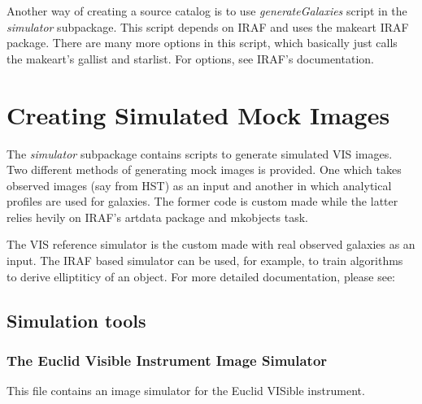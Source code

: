 \documentclass[a4paper,11pt,english]{sphinxmanual}
\begin{document}
Another way of creating a source catalog is to use \emph{generateGalaxies} script in the \emph{simulator} subpackage.
This script depends on IRAF and uses the makeart IRAF package. There are many more options in this script,
which basically just calls the makeart's gallist and starlist. For options, see IRAF's documentation.


\chapter{Creating Simulated Mock Images}
\label{index:creating-simulated-mock-images}
The \emph{simulator} subpackage contains scripts to generate simulated VIS images. Two different methods
of generating mock images is provided. One which takes observed images (say from HST) as an input and
another in which analytical profiles are used for galaxies. The former code is custom made while the
latter relies hevily on IRAF's artdata package and mkobjects task.

The VIS reference simulator is the custom made with real observed galaxies as an input. The IRAF
based simulator can be used, for example, to train algorithms to derive elliptiticy of an object.
For more detailed documentation, please see:


\section{Simulation tools}
\label{simulator:module-simulator.simulator}\label{simulator::doc}\label{simulator:simulation-tools}

\subsection{The Euclid Visible Instrument Image Simulator}
\label{simulator:the-euclid-visible-instrument-image-simulator}
This file contains an image simulator for the Euclid VISible instrument.
\end{document}

